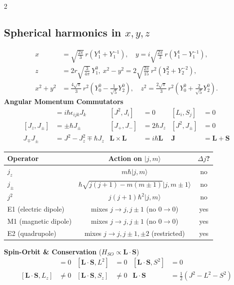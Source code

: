 \documentclass[9pt,a4paper]{article} %
\begin{document}
\begin{multicols}{2}
\subsection{Spherical harmonics in $x,y,z$}
\begin{align*}
    x &= \sqrt{\frac{2\pi}{3}}\, r \left( Y_1^{1} + Y_1^{-1} \right), \quad
    y = i \sqrt{\frac{2\pi}{3}}\, r \left( Y_1^{1} - Y_1^{-1} \right), \\
    z &= 2r \sqrt{\frac{3}{4\pi}}\, Y_1^{0}, \
    x^2 - y^2 = 2 \sqrt{\frac{2\pi}{15}}\, r^2 \left( Y_2^{2} + Y_2^{-2} \right), \\
    x^2 + y^2 &= \frac{4\sqrt{\pi}}{3}\, r^2 \left( Y_0^{0} - \frac{1}{\sqrt{5}} Y_2^{0} \right), \quad
    z^2 = \frac{2\sqrt{\pi}}{3}\, r^2 \left( Y_0^{0} + \frac{2}{\sqrt{5}} Y_2^{0} \right).
\end{align*}
\textbf{Angular Momentum Commutators}
\begin{align*}
    [J_i, J_j] &= i\hbar \epsilon_{ijk} J_k & [J^2, J_i] &= 0 & [L_i, S_j] &= 0 \\
    [J_z, J_\pm] &= \pm\hbar J_\pm & [J_+, J_-] &= 2\hbar J_z & [J^2, J_\pm] &= 0 \\
    J_\mp J_\pm &= J^2 - J_z^2 \mp \hbar J_z & \mathbf{L}\times\mathbf{L} &= i\hbar\mathbf{L} & \mathbf{J} &= \mathbf{L}+\mathbf{S}
\end{align*}
\begin{center}
\begin{tabular}{lcc}
\hline
Operator          & Action on $|j,m\rangle$                          & $\Delta j$? \\
\hline
$j_z$             & $m\hbar |j,m\rangle$                             & no \\
$j_\pm$           & $\hbar\sqrt{j(j+1)-m(m\pm1)} |j,m\pm1\rangle$    & no \\
$j^2$             & $j(j+1)\hbar^2 |j,m\rangle$                      & no \\
\hline
E1 (electric dipole)  & mixes $j\to j,j\pm1$ (no $0\to0$)            & yes \\
M1 (magnetic dipole)  & mixes $j\to j,j\pm1$ (no $0\to0$)            & yes \\
E2 (quadrupole)       & mixes $j\to j,j\pm1,\pm2$ (restricted)       & yes \\
\hline
\end{tabular}
\end{center}
\textbf{Spin-Orbit \& Conservation} ($H_{SO} \propto \mathbf{L}\cdot\mathbf{S}$)
\begin{align*}
    [\mathbf{L}\cdot\mathbf{S}, \mathbf{J}] &= 0 & [\mathbf{L}\cdot\mathbf{S}, L^2] &= 0 & [\mathbf{L}\cdot\mathbf{S}, S^2] &= 0 \\
    [\mathbf{L}\cdot\mathbf{S}, L_z] &\neq 0 & [\mathbf{L}\cdot\mathbf{S}, S_z] &\neq 0 & \mathbf{L}\cdot\mathbf{S} &= \tfrac{1}{2}(J^2 - L^2 - S^2)
\end{align*}

\end{multicols}
\end{document}
